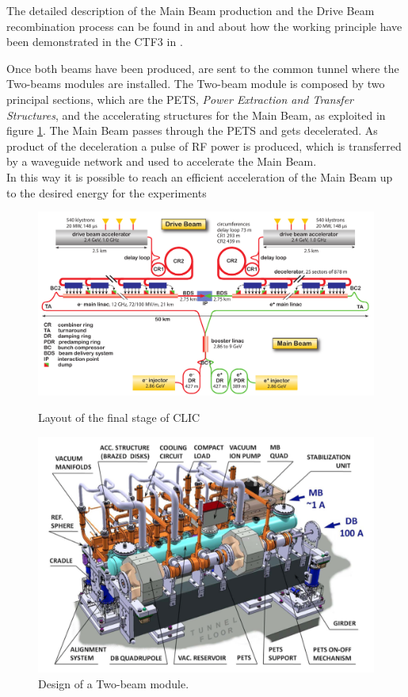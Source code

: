 The detailed description of the Main Beam production and the Drive Beam recombination process can be found in \cite{CLIC:cdr} and about how the working principle have been demonstrated in the CTF3 in \cite{CTF:drive_beam}. 

Once both beams have been produced, are sent to the common tunnel where the Two-beams modules are installed. The Two-beam module is composed by two principal sections, which are the PETS, \textit{Power Extraction and Transfer Structures}, and the accelerating structures for the Main Beam, as exploited in figure \ref{TBM}. The Main Beam passes through the PETS and gets decelerated. As product of the deceleration a pulse of RF power is produced, which is transferred by a waveguide network and used to accelerate the Main Beam.\\ In this way it is possible to reach an efficient acceleration of the Main Beam up to the desired energy for the experiments

\begin{figure}
\centering

\includegraphics[scale=0.39]{pictures/CLIC_layout_3Tev}
\caption{Layout of the final stage of CLIC}
\label{CLIC_layout}

\hspace{8mm}

\includegraphics[scale=0.39]{pictures/TBM}
\caption{Design of a Two-beam module. }
\label{TBM}

\end{figure}





